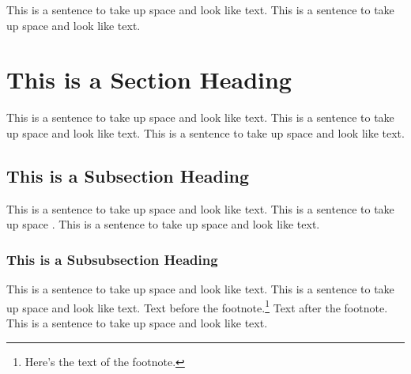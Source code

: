 This is a sentence to take up space and look like text.
This is a sentence to take up space and look like text.

\section{This is a Section Heading}

This is a sentence to take up space and look like text.
This is a sentence to take up space and look like text.
This is a sentence to take up space and look like text.

\subsection{This is a Subsection Heading}

This is a sentence to take up space and look like text.
This is a sentence to take up space \cite{anotherbook}.
This is a sentence to take up space and look like text.

\subsubsection{This is a Subsubsection Heading}
This is a sentence to take up space and look like text.
This is a sentence to take up space and look like text.
Text before the footnote.\footnote{Here's the text of the footnote.}
Text after the footnote.
This is a sentence to take up space and look like text.

